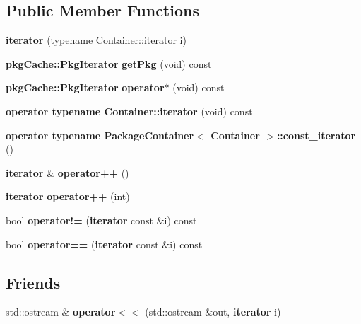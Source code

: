 \subsection*{\-Public \-Member \-Functions}
\begin{DoxyCompactItemize}
\item 
{\bfseries iterator} (typename \-Container\-::iterator i)\label{classAPT_1_1PackageContainer_1_1iterator_a5c6e5c8e05a41906509194e7c2c133c3}

\item 
{\bf pkg\-Cache\-::\-Pkg\-Iterator} {\bfseries get\-Pkg} (void) const \label{classAPT_1_1PackageContainer_1_1iterator_a4574fcd19dd76880a0520165b9f0f21b}

\item 
{\bf pkg\-Cache\-::\-Pkg\-Iterator} {\bfseries operator$\ast$} (void) const \label{classAPT_1_1PackageContainer_1_1iterator_a662c7be39b65a76ae975a24986921311}

\item 
{\bfseries operator typename Container\-::iterator} (void) const \label{classAPT_1_1PackageContainer_1_1iterator_ae8994dcb1ebfd91f79c7a145e33e200f}

\item 
{\bfseries operator typename Package\-Container$<$ Container $>$\-::const\-\_\-iterator} ()\label{classAPT_1_1PackageContainer_1_1iterator_adc19414da153940cf4a80b8d93823979}

\item 
{\bf iterator} \& {\bfseries operator++} ()\label{classAPT_1_1PackageContainer_1_1iterator_af1b1c7856a59f34c7d3570f946a2ff00}

\item 
{\bf iterator} {\bfseries operator++} (int)\label{classAPT_1_1PackageContainer_1_1iterator_a538d230f8b52d2bc0950e26ce74ec239}

\item 
bool {\bfseries operator!=} ({\bf iterator} const \&i) const \label{classAPT_1_1PackageContainer_1_1iterator_a794abc0af03e4e4e24e1b6938969fe46}

\item 
bool {\bfseries operator==} ({\bf iterator} const \&i) const \label{classAPT_1_1PackageContainer_1_1iterator_a1db698b37e59f1c8816f980935da529c}

\end{DoxyCompactItemize}
\subsection*{\-Friends}
\begin{DoxyCompactItemize}
\item 
std\-::ostream \& {\bfseries operator$<$$<$} (std\-::ostream \&out, {\bf iterator} i)\label{classAPT_1_1PackageContainer_1_1iterator_aacdf1b6835cfa9ad97cb9f10c53bb191}

\end{DoxyCompactItemize}
